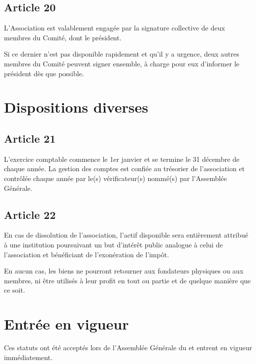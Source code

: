 \documentclass[12pt,twoside]{report}
\begin{document}
\section*{Article 20}
L’Association est valablement engagée par la signature collective de deux membres du Comité, dont le président.

Si ce dernier n'est pas disponible rapidement et qu'il y a urgence, deux autres membres du Comité peuvent signer ensemble, à charge pour eux d'informer le président dès que possible. 

\chapter*{Dispositions diverses}

\section*{Article 21}
L'exercice comptable commence le 1er janvier et se termine le 31 décembre de chaque année.
La gestion des comptes est confiée au trésorier de l'association et contrôlée chaque année par le(s) vérificateur(s) nommé(s) par l'Assemblée Générale.

\section*{Article 22}
En cas de dissolution de l'association, l'actif disponible sera entièrement attribué à une institution poursuivant un but d'intérêt public analogue à celui de l'association et bénéficiant de l’exonération de l’impôt.

En aucun cas, les biens ne pourront retourner aux fondateurs physiques ou aux membres, ni être utilisés à leur profit en tout ou partie et de quelque manière que ce soit.

\chapter*{Entrée en vigueur}
Ces statuts ont été acceptés lors de l’Assemblée Générale du \underline{\hspace{3cm}} et entrent en vigueur immédiatement.

\vspace{1.5cm}


\vspace{2cm}


\vspace{4cm}

\end{document}
